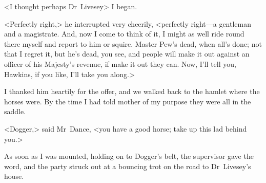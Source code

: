 <I thought perhaps Dr~Livesey\longdash> I began.

<Perfectly right,> he interrupted very cheerily, <perfectly right—a gentleman and a magistrate. And, now I come to think of it, I might as well ride round there myself and report to him or squire. Master Pew's dead, when all's done; not that I regret it, but he's dead, you see, and people will make it out against an officer of his Majesty's revenue, if make it out they can. Now, I'll tell you, Hawkins, if you like, I'll take you along.>

I thanked him heartily for the offer, and we walked back to the hamlet where the horses were. By the time I had told mother of my purpose they were all in the saddle.

<Dogger,> said Mr~Dance, <you have a good horse; take up this lad behind you.>

As soon as I was mounted, holding on to Dogger's belt, the supervisor gave the word, and the party struck out at a bouncing trot on the road to Dr~Livesey's house.